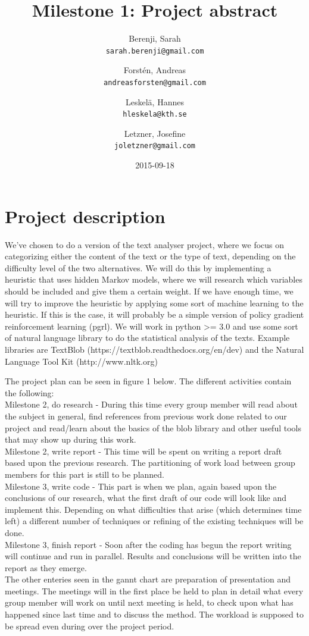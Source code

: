 \documentclass[a4paper]{article}
\title{Milestone 1: Project abstract}
\author{
  Berenji, Sarah\\
  \texttt{sarah.berenji@gmail.com}
  \and
  Forstén, Andreas\\
  \texttt{andreasforsten@gmail.com}
  \and
  Leskelä, Hannes\\
  \texttt{hleskela@kth.se}
  \and
  Letzner, Josefine\\
    \texttt{joletzner@gmail.com}
}
\date{2015-09-18}
\begin{document}
\maketitle
\section*{{Project description}}

We've chosen to do a version of the text analyser project, where we focus on categorizing either the content of the text or the type of text, depending on the difficulty level of the two alternatives. We will do this by implementing a heuristic that uses hidden Markov models, where we will research which variables should be included and give them a certain weight. If we have enough time, we will try to improve the heuristic by applying some sort of machine learning to the heuristic. If this is the case, it will probably be a simple version of policy gradient reinforcement learning (pgrl). We will work in python \textgreater= 3.0 and use some sort of natural language library to do the statistical analysis of the texts. Example libraries are TextBlob (https://textblob.readthedocs.org/en/dev) and the Natural Language Tool Kit (http://www.nltk.org)
\newline

\noindent The project plan can be seen in figure 1 below. The different activities contain the following:\\
Milestone 2, do research - During this time every group member will read about the subject in general, find references from previous work done related to our project and read/learn about the basics of the blob library and other useful tools that may show up during this work.\\
Milestone 2, write report - This time will be spent on writing a report draft based upon the previous research. The partitioning of work load between group members for this part is still to be planned.\\
Milestone 3, write code - This part is when we plan, again based upon the conclusions of our research, what the first draft of our code will look like and implement this. Depending on what difficulties that arise (which determines time left) a different number of techniques or refining of the existing techniques will be done. \\
Milestone 3, finish report - Soon after the coding has begun the report writing will continue and run in parallel. Results and conclusions will be written into the report as they emerge.\\
The other enteries seen in the gannt chart are preparation of presentation and meetings. The meetings will in the first place be held to plan in detail what every group member will work on until next meeting is held, to check upon what has happened since last time and to discuss the method. The workload is supposed to be spread even during over the project period.
  
\end{document}

